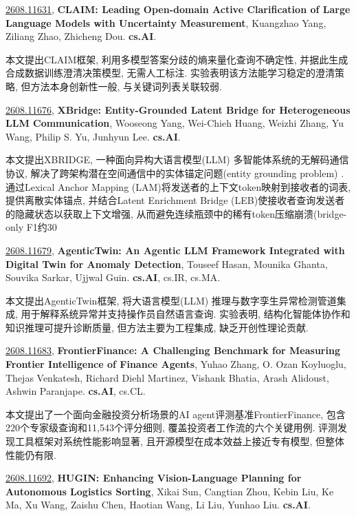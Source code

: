 \documentclass[9pt, a4paper]{article}
\theoremstyle{plain}
\theoremstyle{definition}
\theoremstyle{remark}
\newcommand{\arxivwithtarget}[3]{\hypertarget{#1}{}\href{https://arxiv.org/abs/#1}{#1}, \textbf{\textcolor{arxivblue}{#2}}, #3. }
\begin{document}
\arxivwithtarget{2608.11631}{CLAIM: Leading Open-domain Active Clarification of Large Language Models with Uncertainty Measurement}{Kuangzhao Yang, Ziliang Zhao, Zhicheng Dou}\textbf{cs.AI}.

本文提出CLAIM框架, 利用多模型答案分歧的熵来量化查询不确定性, 并据此生成合成数据训练澄清决策模型, 无需人工标注. 实验表明该方法能学习稳定的澄清策略, 但方法本身创新性一般, 与关键词列表关联较弱.


\arxivwithtarget{2608.11676}{XBridge: Entity-Grounded Latent Bridge for Heterogeneous LLM Communication}{Wooseong Yang, Wei-Chieh Huang, Weizhi Zhang, Yu Wang, Philip S. Yu, Junhyun Lee}\textbf{cs.AI}.

本文提出XBRIDGE, 一种面向异构大语言模型(LLM) 多智能体系统的无解码通信协议, 解决了跨架构潜在空间通信中的实体锚定问题(entity grounding problem) . 通过Lexical Anchor Mapping (LAM)将发送者的上下文token映射到接收者的词表, 提供离散实体锚点, 并结合Latent Enrichment Bridge (LEB)使接收者查询发送者的隐藏状态以获取上下文增强, 从而避免连续瓶颈中的稀有token压缩崩溃(bridge-only F1约30%


\arxivwithtarget{2608.11679}{AgenticTwin: An Agentic LLM Framework Integrated with Digital Twin for Anomaly Detection}{Touseef Hasan, Mounika Ghanta, Souvika Sarkar, Ujjwal Guin}\textbf{cs.AI}, cs.IR, cs.MA.

本文提出AgenticTwin框架, 将大语言模型(LLM) 推理与数字孪生异常检测管道集成, 用于解释系统异常并支持操作员自然语言查询. 实验表明, 结构化智能体协作和知识推理可提升诊断质量, 但方法主要为工程集成, 缺乏开创性理论贡献.


\arxivwithtarget{2608.11683}{FrontierFinance: A Challenging Benchmark for Measuring Frontier Intelligence of Finance Agents}{Yuhao Zhang, O. Ozan Koyluoglu, Thejas Venkatesh, Richard Diehl Martinez, Vishank Bhatia, Arash Alidoust, Ashwin Paranjape}\textbf{cs.AI}, cs.CL.

本文提出了一个面向金融投资分析场景的AI agent评测基准FrontierFinance, 包含220个专家级查询和11,543个评分细则, 覆盖投资者工作流的六个关键用例. 评测发现工具框架对系统性能影响显著, 且开源模型在成本效益上接近专有模型, 但整体性能仍有限.


\arxivwithtarget{2608.11692}{HUGIN: Enhancing Vision-Language Planning for Autonomous Logistics Sorting}{Xikai Sun, Cangtian Zhou, Kebin Liu, Ke Ma, Xu Wang, Zaishu Chen, Haotian Wang, Li Liu, Yunhao Liu}\textbf{cs.AI}.
\end{document}

